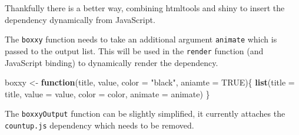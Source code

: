 \documentclass[
]{krantz}
\makeatletter
\newenvironment{Shaded}{\begin{snugshade}}{\end{snugshade}}
\newcommand{\CommentTok}[1]{\textcolor[rgb]{0.37,0.37,0.37}{\textit{#1}}}
\newcommand{\ControlFlowTok}[1]{\textcolor[rgb]{0.27,0.27,0.27}{\textbf{#1}}}
\newcommand{\DataTypeTok}[1]{\textcolor[rgb]{0.27,0.27,0.27}{#1}}
\newcommand{\KeywordTok}[1]{\textcolor[rgb]{0.27,0.27,0.27}{\textbf{#1}}}
\newcommand{\NormalTok}[1]{#1}
\newcommand{\OperatorTok}[1]{\textcolor[rgb]{0.43,0.43,0.43}{\textbf{#1}}}
\newcommand{\OtherTok}[1]{\textcolor[rgb]{0.37,0.37,0.37}{#1}}
\newcommand{\StringTok}[1]{\textcolor[rgb]{0.5,0.5,0.5}{#1}}
\newenvironment{kframe}{%
\medskip{}
\setlength{\fboxsep}{.8em}
 \def\at@end@of@kframe{}%
 \ifinner\ifhmode%
  \def\at@end@of@kframe{\end{minipage}}%
  \begin{minipage}{\columnwidth}%
 \fi\fi%
 \def\FrameCommand##1{\hskip\@totalleftmargin \hskip-\fboxsep
 \colorbox{shadecolor}{##1}\hskip-\fboxsep
     \hskip-\linewidth \hskip-\@totalleftmargin \hskip\columnwidth}%
 \MakeFramed {\advance\hsize-\width
   \@totalleftmargin\z@ \linewidth\hsize
   \@setminipage}}%
 {\par\unskip\endMakeFramed%
 \at@end@of@kframe}
\renewenvironment{Shaded}{\begin{kframe}}{\end{kframe}}
\makeatother
\begin{document}
Thankfully there is a better way, combining htmltools and shiny to insert the dependency dynamically from JavaScript.

The \texttt{boxxy} function needs to take an additional argument \texttt{animate} which is passed to the output list. This will be used in the \texttt{render} function (and JavaScript binding) to dynamically render the dependency.

\begin{Shaded}
\begin{Highlighting}[]
\NormalTok{boxxy \textless{}{-}}\StringTok{ }\ControlFlowTok{function}\NormalTok{(title, value, }\DataTypeTok{color =} \StringTok{"black"}\NormalTok{, }\DataTypeTok{aniamte =} \OtherTok{TRUE}\NormalTok{)\{}
  \KeywordTok{list}\NormalTok{(}\DataTypeTok{title =}\NormalTok{ title, }\DataTypeTok{value =}\NormalTok{ value, }\DataTypeTok{color =}\NormalTok{ color, }\DataTypeTok{animate =}\NormalTok{ animate)}
\NormalTok{\}}
\end{Highlighting}
\end{Shaded}

The \texttt{boxxyOutput} function can be slightly simplified, it currently attaches the \texttt{countup.js} dependency which needs to be removed.

\begin{Shaded}
\end{Shaded}
\end{document}
